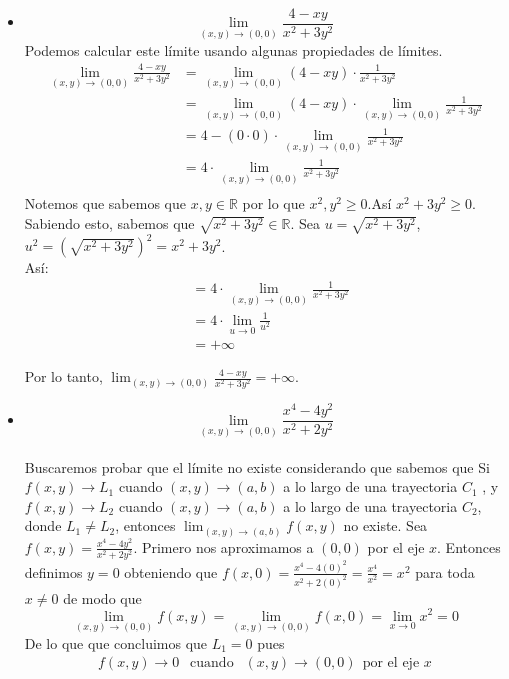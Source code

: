\documentclass[12pt]{article}
\begin{document}
\begin{itemize}[format=\textbf]

\item $$\lim_{(x,y) \to (0,0)} \frac{4-xy}{x^2+3y^2}$$
  Podemos calcular este límite usando algunas propiedades de límites.
   \begin{align*}
     \lim_{(x,y) \to (0,0)} \frac{4-xy}{x^2+3y^2}
     &=  \lim_{(x,y) \to (0,0)} (4-xy) \cdot \frac{1}{x^2+3y^2} \\
     &=  \lim_{(x,y) \to (0,0)} (4-xy) \cdot  \lim_{(x,y) \to (0,0)} \frac{1}{x^2+3y^2} \\
     &= 4-(0\cdot0) \cdot  \lim_{(x,y) \to (0,0)} \frac{1}{x^2+3y^2} \\
     &= 4 \cdot  \lim_{(x,y) \to (0,0)} \frac{1}{x^2+3y^2} \\
  \end{align*}
   Notemos que sabemos que $x, y \in  \mathbb{R}$ por lo que $x^2, y^2 \geq 0$.Así $x^2 + 3y^2 \geq 0$. Sabiendo esto, sabemos que $\sqrt{x^2 + 3y^2} \in \mathbb{R}$. Sea $u = \sqrt{x^2 + 3y^2}$, $u^2 = (\sqrt{x^2 + 3y^2})^2 =x^2 + 3y^2 $.\\ 
   Así:
   \begin{align*}
     &= 4 \cdot  \lim_{(x,y) \to (0,0)} \frac{1}{x^2+3y^2} \\
     &= 4 \cdot  \lim_{u \to 0} \frac{1}{u^2}\\
     &= + \infty
   \end{align*}

Por lo tanto, $ \lim_{(x,y) \to (0,0)} \frac{4-xy}{x^2+3y^2} = + \infty$.
\item $$\lim_{(x,y) \to (0,0)} \frac{x^4-4y^2}{x^2+2y^2}$$ \\
  Buscaremos probar que el límite no existe considerando que sabemos que
  Si $f(x, y) \rightarrow L_1$ cuando $(x, y) \rightarrow (a, b)$  a lo largo de una trayectoria $C_1$ , y $f (x, y) \rightarrow L_2$ cuando $ (x, y) \rightarrow (a, b)$ a lo largo de una trayectoria $C_2$, donde $L_1 \neq L_2$,
entonces $\lim_{(x,y) \to (a,b)} f(x,y)$  no existe.
Sea $f(x,y) = \frac{x^4-4y^2}{x^2+2y^2}$. Primero nos aproximamos a $(0,0)$ por el eje $x$. Entonces definimos $y=0$ obteniendo que $f(x,0)=\frac{x^4-4(0)^2}{x^2+2(0)^2} = \frac{x^4}{x^2}=x^2$ para toda $x \neq 0$ de modo que
$$\lim_{(x,y) \to (0,0)} f(x,y) =  \lim_{(x,y) \to (0,0)} f(x,0) =  \lim_{x \to 0} x^2 = 0  $$
De lo que que concluimos que $L_1 = 0$ pues
  \begin{align*}
    f(x,y) \rightarrow 0 ~~ \text{ cuando }~~ (x,y) \rightarrow (0,0) ~~ \text{por el eje }x
  \end{align*}
  

\end{itemize}
\end{document}
